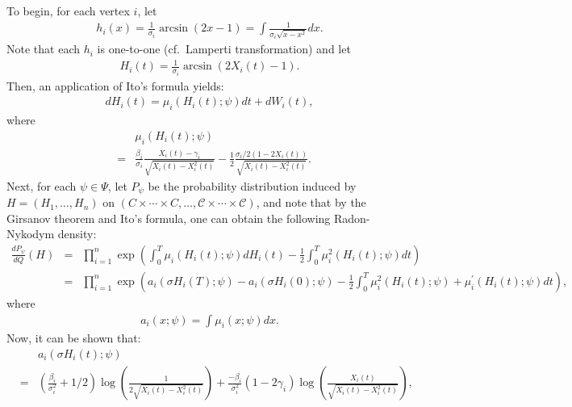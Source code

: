 \documentclass[12pt]{article}%
\begin{document}
To begin, for each vertex $i$, let
\begin{eqnarray}
h_i(x) = \frac{1}{\sigma_i}\arcsin(2x-1) = \int \frac{1}{\sigma_i\sqrt{x-x^2}}dx.
\end{eqnarray}
Note that each $h_i$ is one-to-one (cf.\ Lamperti transformation) and let
\begin{eqnarray}
H_i(t) = \frac{1}{\sigma_i}\arcsin(2X_i(t)-1).
\end{eqnarray}
Then, an application of Ito's formula yields:
\begin{eqnarray}
dH_i(t) = \mu_i(H_i(t);\psi) dt + dW_i(t),
\end{eqnarray}
where
\begin{eqnarray*}
&\ & \mu_i(H_i(t);\psi) \\
&=& \frac{\beta_i}{\sigma_i} \frac{X_i(t)-\gamma_i}{\sqrt{X_i(t)-X_i^2(t)}}
-  \frac{1}{2} \frac{\sigma_i/2 (1-2X_i(t))}{\sqrt{X_i(t) - X_i^2(t)}}.%
\end{eqnarray*}
Next, for each $\psi \in \Psi$, let $P_\psi$ be the probability distribution induced by $H = (H_1,\ldots, H_n)$ on $(C\times\cdots\times C,\ldots, \mathcal C\times\cdots\times \mathcal C)$, and note that by the Girsanov theorem and Ito's formula,  
one can obtain the following Radon-Nykodym density:
\begin{eqnarray*}
\frac{dP_{\psi}}{dQ}(H)
&= &
\prod_{i=1}^n \exp\left(
\int_0^T \mu_i(H_i(t);\psi)dH_i(t)
-
\frac{1}{2} \int_0^T \mu_i^2(H_i(t);\psi)dt\right)\\
&= &
\prod_{i=1}^n \exp\left(
a_i(\sigma H_i(T);\psi) - a_i(\sigma H_i(0);\psi)
-\frac{1}{2} \int_0^T \mu_i^2(H_i(t);\psi) + \mu_i^\prime(H_i(t);\psi) dt\right),
\end{eqnarray*}
where
\begin{eqnarray*}
a_i(x;\psi) = \int \mu_i(x;\psi) dx.
\end{eqnarray*}
Now, it can be shown that:
\begin{eqnarray*}
&\ &a_i(\sigma H_i(t);\psi)  \\
&= &
\left(\frac{\beta_i}{\sigma_i^2} + 1/2\right)
\log\left( \frac{1}{2\sqrt{X_i(t) - X_i^2(t)}} \right)
+
\frac{-\beta_i}{\sigma_i^2} (1-2\gamma_i)
\log\left( \frac{X_i(t)}{\sqrt{X_i(t) - X_i^2(t)}} \right),
\end{eqnarray*}
\end{document}
